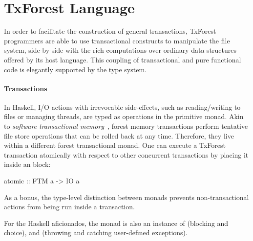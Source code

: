 
\section{TxForest Language}


In order to facilitate the construction of general transactions, TxForest programmers are able to use transactional constructs to manipulate the file system, side-by-side with the rich computations over ordinary data structures offered by its host language.
This coupling of transactional and pure functional code is elegantly supported by the type system.

\paragraph{Transactions}
In Haskell, I/O actions with irrevocable side-effects, such as reading/writing to files or managing threads, are typed as operations in the primitive  monad.
Akin to \emph{software transactional memory}~\cite{HaskellSTM}, forest memory transactions perform tentative file store operations that can be rolled  back at any time. Therefore, they live within a different  forest transactional monad.
One can execute a TxForest transaction atomically with respect to other concurrent transactions by placing it inside an  block:
\begin{code}
atomic :: FTM a -> IO a
\end{code}
As a bonus, the type-level distinction between monads prevents non-transactional actions from being run inside a transaction.

For the Haskell aficionados, the  monad is also an instance of  (blocking and choice),  and  (throwing and catching user-defined exceptions).


